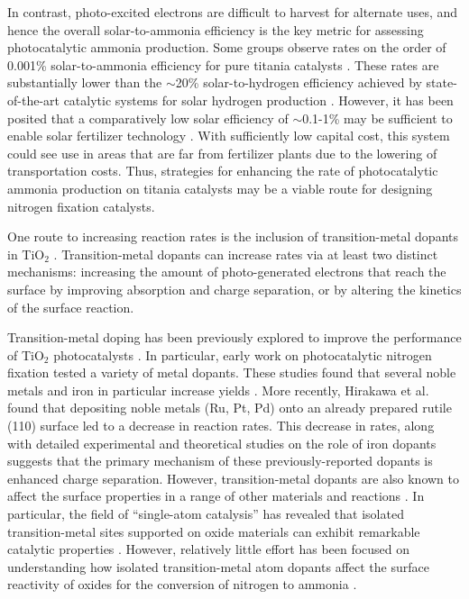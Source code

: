 In contrast, photo-excited electrons are difficult to harvest for alternate uses, and hence the overall solar-to-ammonia efficiency is the key metric for assessing photocatalytic ammonia production. Some groups observe rates on the order of 0.001\% solar-to-ammonia efficiency for pure titania catalysts \cite{Hirakawa_2017}. These rates are substantially lower than the $\sim$20\% solar-to-hydrogen efficiency achieved by state-of-the-art catalytic systems for solar hydrogen production \cite{Nakamura_2015, Jia_2016}. However, it has been posited that a comparatively low solar efficiency of $\sim$0.1-1\% may be sufficient to enable solar fertilizer technology \cite{Comer_2019, Medford_2017}. With sufficiently low capital cost, this system could see use in areas that are far from fertilizer plants due to the lowering of transportation costs. Thus, strategies for enhancing the rate of photocatalytic ammonia production on titania catalysts may be a viable route for designing nitrogen fixation catalysts.

One route to increasing reaction rates is the inclusion of transition\hyp{}metal dopants in TiO$_2$ \cite{Zaleska_2008}.  Transition\hyp{}metal dopants can increase rates via at least two distinct mechanisms: increasing the amount of photo-generated electrons that reach the surface by improving absorption and charge separation, or by altering the kinetics of the surface reaction.

Transition-metal doping has been previously explored to improve the performance of TiO$_2$ photocatalysts \cite{Schneider_2014, Li_2007, Dozzi_2013}. In particular, early work on photocatalytic nitrogen fixation tested a variety of metal dopants. These studies found that several noble metals \cite{Ranjit_1996} and iron in particular increase yields \cite{Schrauzer_1977, Schrauzer_1983, Augugliaro_1982, Soria_1991, Ranjit_1996, Ranjit_1997}. More recently, Hirakawa et al. found that depositing noble metals (Ru, Pt, Pd) onto an already prepared rutile (110) surface led to a decrease in reaction rates.\cite{Hirakawa_2017} This decrease in rates, along with detailed experimental and theoretical studies on the role of iron dopants  \cite{Soria_1991, Comer_2018} suggests that the primary mechanism of these previously-reported dopants is enhanced charge separation. However, transition-metal dopants are also known to affect the surface properties in a range of other materials and reactions \cite{Khan_2018, Gu_2014, Ammal_2016, Gu_2017, Comer_2018, Garc_a_Mota_2011, Yao_2017}. In particular, the field of ``single-atom catalysis'' has revealed that isolated transition-metal sites supported on oxide materials can exhibit remarkable catalytic properties \cite{Liu_2016, Qiao_2011, O_Connor_2018}. However, relatively little effort has been focused on understanding how isolated transition-metal atom dopants affect the surface reactivity of oxides for the conversion of nitrogen to ammonia \cite{Tao_2019, Liu_2019, Zhao_2019, Cheng_2019, Li_2017}.

